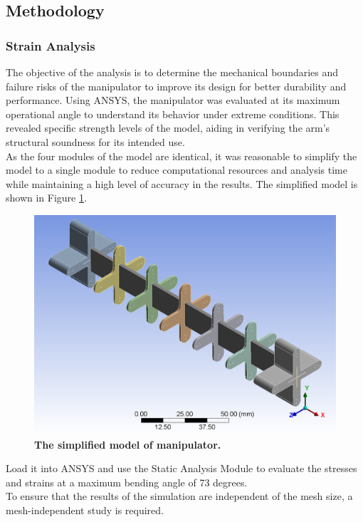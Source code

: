 \subsection{Methodology}
\subsubsection{Strain Analysis}
The objective of the analysis is to determine the mechanical boundaries and failure risks of the manipulator to 
improve its design for better durability and performance. Using ANSYS, the manipulator was evaluated at its maximum 
operational angle to understand its behavior under extreme conditions. This revealed specific strength levels of the 
model, aiding in verifying the arm's structural soundness for its intended use. \\
As the four modules of the model are identical, it was reasonable to simplify the model to a single module to 
reduce computational resources and analysis time while maintaining a high level of accuracy in the results. The 
simplified model is shown in Figure \ref{fig:sim_model}.
\begin{figure}[H] %
    \centering
    \captionsetup{labelsep=colon}
    \includegraphics[width=.85\textwidth]{Image/Design/model.png} 
    \caption[The simplified model of manipulator]
    {\centering \textbf{The simplified model of manipulator.}}
    \label{fig:sim_model}
\end{figure}
\noindent Load it into ANSYS and use the Static Analysis Module to evaluate the stresses and strains at a maximum bending 
angle of 73 degrees. \\
To ensure that the results of the simulation are independent of the mesh size, a mesh-independent study is required. 
